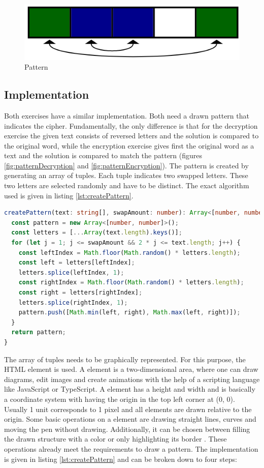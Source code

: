 \begin{figure} 
    \centering
    \includegraphics[width=0.4 \columnwidth]{figures/pattern.png}
    \caption{Pattern} 
    \label{fig:pattern} 
\end{figure}

\subsection{Implementation}

Both exercises have a similar implementation. Both need a drawn pattern that indicates the cipher. Fundamentally, the only difference is that for the decryption exercise the given text consists of reversed letters and the solution is compared to the original word, while the encryption exercise gives first the original word as a text and the solution is compared to match the pattern (figures \ref{fig:patternDecryption} and \ref{fig:patternEncryption}). 
The pattern is created by generating an array of tuples. Each tuple indicates two swapped letters. These two letters are selected randomly and have to be distinct. The exact algorithm used is given in listing \ref{lst:createPattern}.

\begin{lstlisting}[language=TypeScript,caption={Algorithm to generate an array of distinct tuples of given size},label={lst:createPattern}]
createPattern(text: string[], swapAmount: number): Array<[number, number]> {
  const pattern = new Array<[number, number]>();
  const letters = [...Array(text.length).keys()];
  for (let j = 1; j <= swapAmount && 2 * j <= text.length; j++) {
    const leftIndex = Math.floor(Math.random() * letters.length);
    const left = letters[leftIndex];
    letters.splice(leftIndex, 1);
    const rightIndex = Math.floor(Math.random() * letters.length);
    const right = letters[rightIndex];
    letters.splice(rightIndex, 1);
    pattern.push([Math.min(left, right), Math.max(left, right)]);
  }
  return pattern;
}
\end{lstlisting}

The array of tuples needs to be graphically represented. For this purpose, the HTML  element is used. A  element is a two-dimensional area, where one can draw diagrams, edit images and create animations with the help of a scripting language like JavaScript or TypeScript. A  element has a height and width and is basically a coordinate system with having the origin in the top left corner at (0, 0). Usually 1 unit corresponds to 1 pixel and all elements are drawn relative to the origin. Some basic operations on a  element are drawing straight lines, curves and moving the pen without drawing. Additionally, it can be chosen between filling the drawn structure with a color or only highlighting its border \cite{MDNWebDocs}. These operations already meet the requirements to draw a pattern. The implementation is given in  listing \ref{lst:createPattern} and can be broken down to four steps: 

